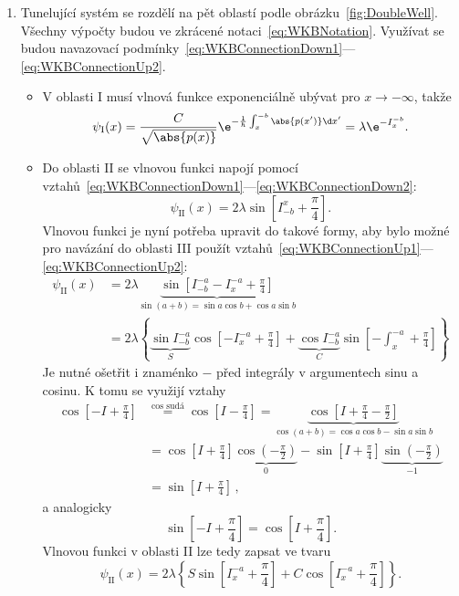 \begin{solution}
	\begin{enumerate}
	\item
		Tunelující systém se rozdělí na pět oblastí podle obrázku~\ref{fig:DoubleWell}.
		Všechny výpočty budou ve zkrácené notaci~\eqref{eq:WKBNotation}.
		Využívat se budou navazovací podmínky~\eqref{eq:WKBConnectionDown1}---\eqref{eq:WKBConnectionUp2}.
		
		\begin{itemize}
		\item
			V oblasti I musí vlnová funkce exponenciálně ubývat pro $x\rightarrow-\infty$, takže
			\begin{equation}
				\psi_{\mathrm{I}}(x)=\frac{C}{\sqrt{\abs{p(x)}}}\e^{-\frac{1}{\hbar}\int_{x}^{-b}\abs{p(x')}\d x'}=\lambda\e^{-I_{x}^{-b}}.
			\end{equation}
			
		\item
			Do oblasti II se vlnovou funkci napojí pomocí vztahů~\eqref{eq:WKBConnectionDown1}---\eqref{eq:WKBConnectionDown2}:
			\begin{equation}
				\psi_{\mathrm{II}}(x)=2\lambda\sin{\left[I_{-b}^{x}+\frac{\pi}{4}\right]}.
			\end{equation}
			Vlnovou funkci je nyní potřeba upravit do takové formy, aby bylo možné pro navázání do oblasti III použít vztahů~\eqref{eq:WKBConnectionUp1}---\eqref{eq:WKBConnectionUp2}:
			\begin{align}
				\psi_{\mathrm{II}}(x)
					&=2\lambda\underbrace{\sin{\left[I_{-b}^{-a}-I_{x}^{-a}+\frac{\pi}{4}\right]}}_{\sin{(a+b)}=\sin{a}\cos{b}+\cos{a}\sin{b}}\nonumber\\
					&=2\lambda\left\{\underbrace{\sin{I_{-b}^{-a}}}_{S}\cos\left[-I_{x}^{-a}+\frac{\pi}{4}\right]+\underbrace{\cos{I_{-b}^{-a}}}_{C}\sin\left[-\int_{x}^{-a}+\frac{\pi}{4}\right]\right\}
			\end{align}
			Je nutné ošetřit i znaménko $-$ před integrály v argumentech sinu a cosinu.
			K tomu se využijí vztahy
			\begin{align}
				\cos\left[-I+\frac{\pi}{4}\right]
					&\stackrel{\cos\text{ sudá}}{=}\cos\left[I-\frac{\pi}{4}\right]=\underbrace{\cos\left[I+\frac{\pi}{4}-\frac{\pi}{2}\right]}_{\cos{(a+b)}=\cos{a}\cos{b}-\sin{a}\sin{b}}\nonumber\\
					&=\cos\left[I+\frac{\pi}{4}\right]\underbrace{\cos\left(-\frac{\pi}{2}\right)}_{0}-\sin\left[I+\frac{\pi}{4}\right]\underbrace{\sin\left(-\frac{\pi}{2}\right)}_{-1}\nonumber\\
					&=\sin\left[I+\frac{\pi}{4}\right]\,,
			\end{align}
			a analogicky
			\begin{equation}
				\sin\left[-I+\frac{\pi}{4}\right]=\cos\left[I+\frac{\pi}{4}\right].
			\end{equation}
			Vlnovou funkci v oblasti II lze tedy zapsat ve tvaru
			\begin{equation}
				\psi_{\mathrm{II}}(x)=2\lambda\left\{S\sin\left[I_{x}^{-a}+\frac{\pi}{4}\right]+C\cos\left[I_{x}^{-a}+\frac{\pi}{4}\right]\right\}.
			\end{equation}
		

\end{itemize}
\end{enumerate}
\end{solution}
